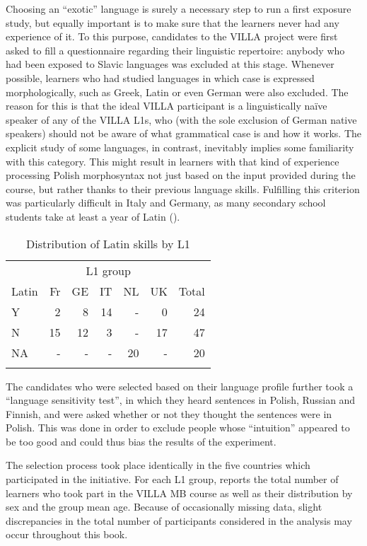 Choosing an “exotic” language is surely a necessary step to run a first exposure study, but equally important is to make sure that the learners never had any experience of it. To this purpose, candidates to the VILLA project were first asked to fill a questionnaire regarding their linguistic repertoire: anybody who had been exposed to Slavic languages was excluded at this stage. Whenever possible, learners who had studied languages in which case is expressed morphologically, such as Greek, Latin or even German were also excluded. The reason for this is that the ideal VILLA participant is a linguistically naïve speaker of any of the VILLA L1s, who (with the sole exclusion of German native speakers) should not be aware of what grammatical case is and how it works. The explicit study of some languages, in contrast, inevitably implies some familiarity with this category. This might result in learners with that kind of experience processing Polish morphosyntax not just based on the input provided during the course, but rather thanks to their previous language skills. Fulfilling this criterion was particularly difficult in Italy and Germany, as many secondary school students take at least a year of Latin (). 

\begin{table}
    \begin{tabularx}{.66\textwidth}{Xrrrrrr}
    \lsptoprule
         & \multicolumn{5}{c}{L1 group} & \\
        Latin & Fr & GE & IT & NL & UK & Total\\
    \midrule
        Y & 2 & 8 & 14 & {}- & 0 & 24\\
        N & 15 & 12 & 3 & {}- & 17 & 47\\
        NA & {}- & {}- & {}- & 20 & {}- & 20\\
    \lspbottomrule
    \end{tabularx}
    \caption{Distribution of Latin skills by L1}
    \label{tab:02:7}
\end{table}

The candidates who were selected based on their language profile further took a “language sensitivity test”, in which they heard sentences in Polish, Russian and Finnish, and were asked whether or not they thought the sentences were in Polish. This was done in order to exclude people whose “intuition” appeared to be too good and could thus bias the results of the experiment.

The selection process took place identically in the five countries which participated in the initiative. For each L1 group,  reports the total number of learners who took part in the VILLA MB course as well as their distribution by sex and the group mean age. Because of occasionally missing data, slight discrepancies in the total number of participants considered in the analysis may occur throughout this book.

